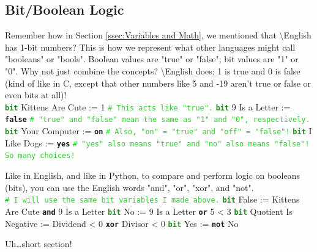 \documentclass{article}
\newcommand{\English}{\textbackslash{}English}				%
\newcommand{\ssecl}[1]{\subsection{#1}\label{ssec:#1}}
\newcommand{\codecomment}[1]{\texttt{\textcolor{LimeGreen}{#1}}}
\newcommand{\commentline}[1]{\codecomment{\# #1}}
\newcommand{\type}[1]{\texttt{\textcolor{ForestGreen}{\textbf{#1}}}}
\newcommand{\common}[1]{\texttt{\textcolor{Mulberry}{\textbf{#1}}}}
\newenvironment{code}[0]
{\ttfamily{}				%
\setlength\parindent{0cm}	%
~\\}
{\setlength\parindent{1cm}
~\\}
\begin{document}
\ssecl{Bit/Boolean Logic}
\indent Remember how in Section \ref{ssec:Variables and Math}, we mentioned that \English{} has 1-bit numbers? This is how we represent what other languages might call "booleans" or "bools". Boolean values are "true" or "false"; bit values are "1" or "0". Why not just combine the concepts? \English{} does; 1 is true and 0 is false (kind of like in C, except that other numbers like 5 and -19 aren't true or false or even bits at all)!
\begin{code}
\type{bit} Kittens Are Cute := 1 \commentline{This acts like "true".}
\type{bit} 9 Is a Letter := \common{false} \commentline{"true" and "false" mean the same as "1" and "0", respectively.}
\type{bit} Your Computer := \common{on} \commentline{Also, "on" = "true" and "off" = "false"!}
\type{bit} I Like Dogs := \common{yes} \commentline{"yes" also means "true" and "no" also means "false"! So many choices!}
\end{code}

\indent Like in English, and like in Python, to compare and perform logic on booleans (bits), you can use the English words "and", "or", "xor", and "not".
\begin{code}
\commentline{I will use the same bit variables I made above.}
\type{bit} False := Kittens Are Cute \common{and} 9 Is a Letter
\type{bit} No := 9 Is a Letter \common{or} 5 < 3
\type{bit} Quotient Is Negative := Dividend < 0 \common{xor} Divisor < 0
\type{bit} Yes := \common{not} No
\end{code}

\indent Uh\ldots short section!
\end{document}
